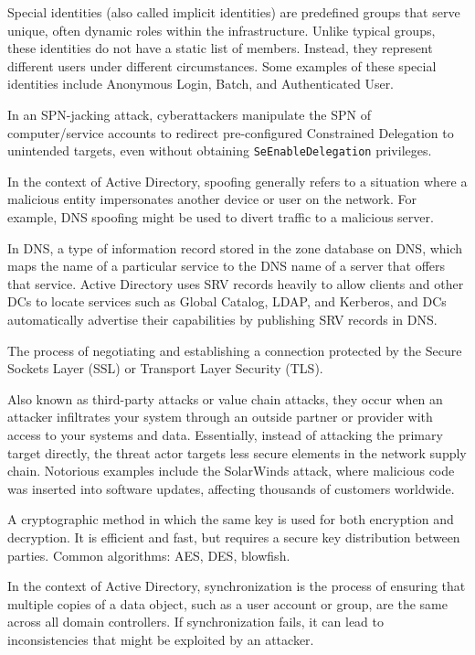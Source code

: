  Special identities (also called implicit identities) are predefined groups that serve unique, often dynamic roles within the infrastructure. Unlike typical groups, these identities do not have a static list of members. Instead, they represent different users under different circumstances. Some examples of these special identities include Anonymous Login, Batch, and Authenticated User.

 In an SPN-jacking attack, cyberattackers manipulate the SPN of computer/service accounts to redirect pre-configured Constrained Delegation to unintended targets, even without obtaining \texttt{SeEnableDelegation} privileges.

 In the context of Active Directory, spoofing generally refers to a situation where a malicious entity impersonates another device or user on the network. For example, DNS spoofing might be used to divert traffic to a malicious server.

 In DNS, a type of information record stored in the zone database on DNS, which maps the name of a particular service to the DNS name of a server that offers that service. Active Directory uses SRV records heavily to allow clients and other DCs to locate services such as Global Catalog, LDAP, and Kerberos, and DCs automatically advertise their capabilities by publishing SRV records in DNS.

 The process of negotiating and establishing a connection protected by the Secure Sockets Layer (SSL) or Transport Layer Security (TLS).

 Also known as third-party attacks or value chain attacks, they occur when an attacker infiltrates your system through an outside partner or provider with access to your systems and data. Essentially, instead of attacking the primary target directly, the threat actor targets less secure elements in the network supply chain. Notorious examples include the SolarWinds attack, where malicious code was inserted into software updates, affecting thousands of customers worldwide.

 A cryptographic method in which the same key is used for both encryption and decryption. It is efficient and fast, but requires a secure key distribution between parties. Common algorithms: AES, DES, blowfish.

 In the context of Active Directory, synchronization is the process of ensuring that multiple copies of a data object, such as a user account or group, are the same across all domain controllers. If synchronization fails, it can lead to inconsistencies that might be exploited by an attacker.

